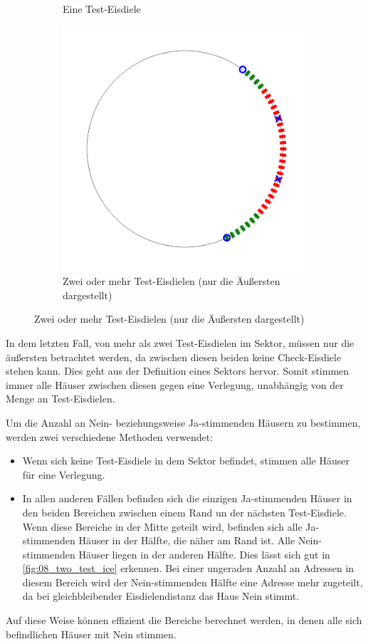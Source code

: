 \documentclass[a4paper,10pt,ngerman,captions=figureheading]{scrartcl}
\newcommand{\imageWidth}{0.3\linewidth}
\begin{document}
\begin{figure}[ht]
\begin{subfigure}[t]{\imageWidth}
        \caption{Eine Test-Eisdiele}
        \label{fig:07_one_test_ice}
    \end{subfigure}
    \begin{subfigure}[t]{\imageWidth}
        \includegraphics[width=\linewidth]{08_two_test_ice.png}
        \caption{Zwei oder mehr Test-Eisdielen (nur die Äußersten dargestellt)}
        \label{fig:08_two_test_ice}
    \end{subfigure}
\end{figure}

In dem letzten Fall, von mehr als zwei Test-Eisdielen im Sektor, müssen nur die äußersten betrachtet werden, da zwischen diesen beiden keine Check-Eisdiele stehen kann.
Dies geht aus der Definition eines Sektors hervor.
Somit stimmen immer alle Häuser zwischen diesen gegen eine Verlegung, unabhängig von der Menge an Test-Eisdielen.

Um die Anzahl an Nein- beziehungsweise Ja-stimmenden Häusern zu bestimmen, werden zwei verschiedene Methoden verwendet:
\begin{itemize}
    \item Wenn sich keine Test-Eisdiele in dem Sektor befindet, stimmen alle Häuser für eine Verlegung.
    \item In allen anderen Fällen befinden sich die einzigen Ja-stimmenden Häuser in den beiden Bereichen zwischen einem Rand un der nächsten Test-Eisdiele.
          Wenn diese Bereiche in der Mitte geteilt wird, befinden sich alle Ja-stimmenden Häuser in der Hälfte, die näher am Rand ist.
          Alle Nein-stimmenden Häuser liegen in der anderen Hälfte.
          Dies lässt sich gut in \autoref{fig:08_two_test_ice} erkennen.
          Bei einer ungeraden Anzahl an Adressen in diesem Bereich wird der Nein-stimmenden Hälfte eine Adresse mehr zugeteilt, da bei gleichbleibender Eisdielendistanz das Haus Nein stimmt.
\end{itemize}
Auf diese Weise können effizient die Bereiche berechnet werden, in denen alle sich befindlichen Häuser mit Nein stimmen.
\end{document}
